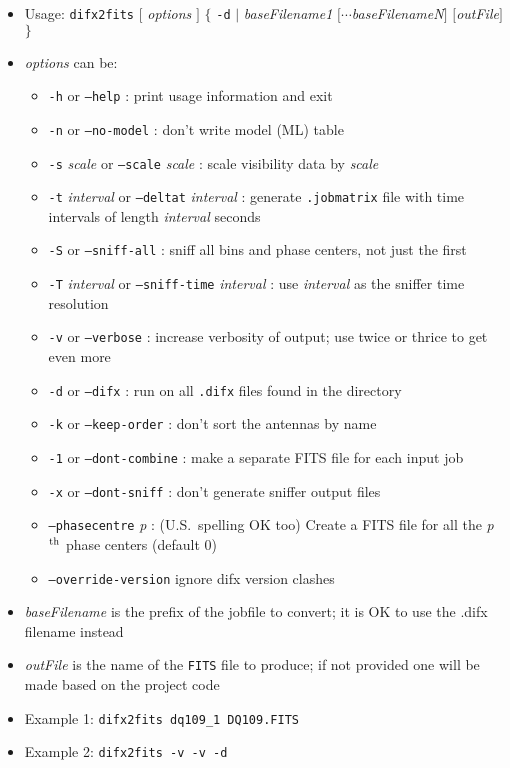 \begin{itemize}
\item[] Usage: {\tt difx2fits} $[$ {\em options} $]$ $\{$ {\tt -d} $\mid$ {\em baseFilename1} $[\cdots${\em baseFilenameN}$]$ $[${\em outFile}$]$ $\}$
\item[] {\em options} can be:
\begin{itemize}
\item[] {\tt -h} or {\tt --help} : print usage information and exit
\item[] {\tt -n} or {\tt --no-model} : don't write model (ML) table
\item[] {\tt -s} {\em scale} or {\tt --scale} {\em scale} : scale visibility data by {\em scale}
\item[] {\tt -t} {\em interval} or {\tt --deltat} {\em interval} : generate {\tt .jobmatrix} file with time intervals of length {\em interval} seconds
\item[] {\tt -S} or {\tt --sniff-all} : sniff all bins and phase centers, not just the first
\item[] {\tt -T} {\em interval} or {\tt --sniff-time} {\em interval} : use {\em interval} as the sniffer time resolution
\item[] {\tt -v} or {\tt --verbose} : increase verbosity of output; use twice or thrice to get even more
\item[] {\tt -d} or {\tt --difx} : run on all {\tt .difx} files found in the directory
\item[] {\tt -k} or {\tt --keep-order} : don't sort the antennas by name
\item[] {\tt -1} or {\tt --dont-combine} : make a separate FITS file for each input job
\item[] {\tt -x} or {\tt --dont-sniff} : don't generate sniffer output files
\item[] {\tt --phasecentre} {\em p} : (U.S.\ spelling OK too) Create a FITS file for all the {\em p}$^{\rm th}$ phase centers (default 0)
\item[] {\tt --override-version} ignore difx version clashes
\end{itemize}
\item[] {\em baseFilename} is the prefix of the jobfile to convert; it is OK to use the .difx filename instead
\item[] {\em outFile} is the name of the {\tt FITS} file to produce; if not provided one will be made based on the project code
\item[] Example 1: {\tt difx2fits dq109\_1 DQ109.FITS}
\item[] Example 2: {\tt difx2fits -v -v -d}
\end{itemize}

